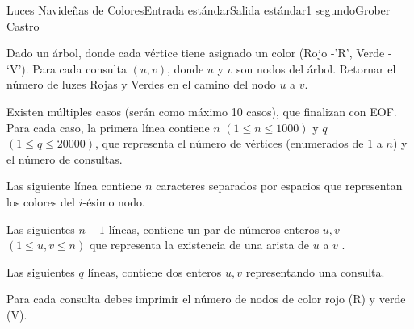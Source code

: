 \begin{problem}{Luces Navideñas de Colores}{Entrada estándar}{Salida estándar}{1 segundo}{}{Grober Castro}

Dado un árbol, donde cada vértice tiene asignado un color (Rojo -'R', Verde - ‘V’). Para cada consulta $(u,v)$, donde $u$ y $v$ son nodos del árbol. Retornar el número de luzes Rojas y Verdes en el camino del nodo $u$ a $v$.


\InputFile

Existen múltiples casos (serán como máximo 10 casos), que finalizan con EOF.
Para cada caso, la primera línea contiene $n$ $(1 \leq n \leq 1000)$  y $q$ $(1 \leq q \leq 20000)$, que representa el número de vértices (enumerados de $1$ a $ n$) y el número de consultas.

Las siguiente línea contiene $n$ caracteres separados por espacios que representan los colores del $i$-ésimo nodo.

Las siguientes $n - 1$ líneas, contiene un par de números enteros $u, v$ $(1 \leq u,v \leq n)$ que representa la existencia de una arista de $u$ a $v$ .

Las siguientes $q$ líneas, contiene dos enteros $u,v $ representando una consulta.

\OutputFile

Para cada consulta debes imprimir el número de nodos de color rojo (R) y verde (V).

\Example

\begin{example}
\end{example}

\end{problem}

